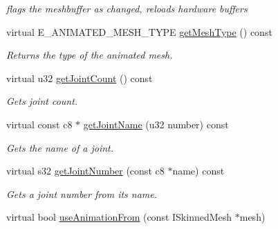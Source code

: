 \begin{DoxyCompactItemize}
\begin{DoxyCompactList}\small\item\em flags the meshbuffer as changed, reloads hardware buffers \end{DoxyCompactList}\item 
\hypertarget{classirr_1_1scene_1_1_c_skinned_mesh_a86d801ccb8a922c9fd5bcf5576e76674}{virtual E\-\_\-\-A\-N\-I\-M\-A\-T\-E\-D\-\_\-\-M\-E\-S\-H\-\_\-\-T\-Y\-P\-E \hyperlink{classirr_1_1scene_1_1_c_skinned_mesh_a86d801ccb8a922c9fd5bcf5576e76674}{get\-Mesh\-Type} () const }\label{classirr_1_1scene_1_1_c_skinned_mesh_a86d801ccb8a922c9fd5bcf5576e76674}

\begin{DoxyCompactList}\small\item\em Returns the type of the animated mesh. \end{DoxyCompactList}\item 
\hypertarget{classirr_1_1scene_1_1_c_skinned_mesh_a442635bd9f0e8827a350245bcdcdd564}{virtual u32 \hyperlink{classirr_1_1scene_1_1_c_skinned_mesh_a442635bd9f0e8827a350245bcdcdd564}{get\-Joint\-Count} () const }\label{classirr_1_1scene_1_1_c_skinned_mesh_a442635bd9f0e8827a350245bcdcdd564}

\begin{DoxyCompactList}\small\item\em Gets joint count. \end{DoxyCompactList}\item 
\hypertarget{classirr_1_1scene_1_1_c_skinned_mesh_ab36a098231f1e42f2160b89e81d863c0}{virtual const c8 $\ast$ \hyperlink{classirr_1_1scene_1_1_c_skinned_mesh_ab36a098231f1e42f2160b89e81d863c0}{get\-Joint\-Name} (u32 number) const }\label{classirr_1_1scene_1_1_c_skinned_mesh_ab36a098231f1e42f2160b89e81d863c0}

\begin{DoxyCompactList}\small\item\em Gets the name of a joint. \end{DoxyCompactList}\item 
\hypertarget{classirr_1_1scene_1_1_c_skinned_mesh_a0ac5cb232ee475b774f8ede0c1b9b530}{virtual s32 \hyperlink{classirr_1_1scene_1_1_c_skinned_mesh_a0ac5cb232ee475b774f8ede0c1b9b530}{get\-Joint\-Number} (const c8 $\ast$name) const }\label{classirr_1_1scene_1_1_c_skinned_mesh_a0ac5cb232ee475b774f8ede0c1b9b530}

\begin{DoxyCompactList}\small\item\em Gets a joint number from its name. \end{DoxyCompactList}\item 
\hypertarget{classirr_1_1scene_1_1_c_skinned_mesh_a58255d1623292d8fa6f7386928e0160a}{virtual bool \hyperlink{classirr_1_1scene_1_1_c_skinned_mesh_a58255d1623292d8fa6f7386928e0160a}{use\-Animation\-From} (const I\-Skinned\-Mesh $\ast$mesh)}\label{classirr_1_1scene_1_1_c_skinned_mesh_a58255d1623292d8fa6f7386928e0160a}


\end{DoxyCompactItemize}
